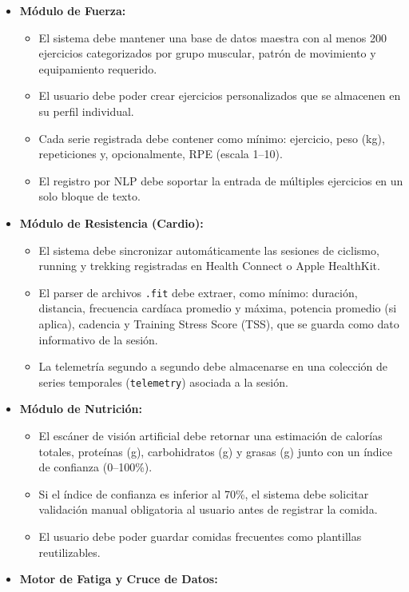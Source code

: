 \begin{itemize}
    \item \textbf{Módulo de Fuerza:}
    \begin{itemize}
        \item El sistema debe mantener una base de datos maestra con al menos 200 ejercicios categorizados por grupo muscular, patrón de movimiento y equipamiento requerido.
        \item El usuario debe poder crear ejercicios personalizados que se almacenen en su perfil individual.
        \item Cada serie registrada debe contener como mínimo: ejercicio, peso (kg), repeticiones y, opcionalmente, RPE (escala 1--10).
        \item El registro por NLP debe soportar la entrada de múltiples ejercicios en un solo bloque de texto.
    \end{itemize}
    \item \textbf{Módulo de Resistencia (Cardio):}
    \begin{itemize}
        \item El sistema debe sincronizar automáticamente las sesiones de ciclismo, running y trekking registradas en Health Connect o Apple HealthKit.
        \item El parser de archivos \texttt{.fit} debe extraer, como mínimo: duración, distancia, frecuencia cardíaca promedio y máxima, potencia promedio (si aplica), cadencia y Training Stress Score (TSS), que se guarda como dato informativo de la sesión.
        \item La telemetría segundo a segundo debe almacenarse en una colección de series temporales (\texttt{telemetry}) asociada a la sesión.
    \end{itemize}
    \item \textbf{Módulo de Nutrición:}
    \begin{itemize}
        \item El escáner de visión artificial debe retornar una estimación de calorías totales, proteínas (g), carbohidratos (g) y grasas (g) junto con un índice de confianza (0--100\%).
        \item Si el índice de confianza es inferior al 70\%, el sistema debe solicitar validación manual obligatoria al usuario antes de registrar la comida.
        \item El usuario debe poder guardar comidas frecuentes como plantillas reutilizables.
    \end{itemize}
    \item \textbf{Motor de Fatiga y Cruce de Datos:}

\end{itemize}
